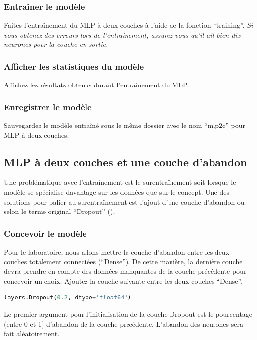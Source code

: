 \documentclass{article}
\begin{document}
\subsubsection{Entraîner le modèle}
Faites l'entraînement du MLP à deux couches à l'aide de la fonction ``training''.
\medbreak
\textit{Si vous obtenez des erreurs lors de l'entraînement, assurez-vous qu'il ait bien dix neurones pour la couche en sortie.}
\subsubsection{Afficher les statistiques du modèle}
Affichez les résultats obtenus durant l'entraînement du MLP.
\subsubsection{Enregistrer le modèle}
Sauvegardez le modèle entraîné sous le même dossier avec le nom ``mlp2c'' pour MLP à deux couches.

\subsection{MLP à deux couches et une couche d'abandon}
Une problématique avec l'entraînement est le surentraînement soit lorsque le modèle se spécialise davantage sur les données que sur le concept. Une des solutions pour palier au surentraînement est l'ajout d'une couche d'abandon ou selon le terme original ``Dropout'' (\cite{Dropout-article}).
\subsubsection{Concevoir le modèle}
Pour le laboratoire, nous allons mettre la couche d'abandon entre les deux couches totalement connectées (``Dense''). De cette manière, la dernière couche devra prendre en compte des données manquantes de la couche précédente pour concevoir un choix. Ajoutez la couche suivante entre les deux couches ``Dense''.
\medbreak

\begin{lstlisting}[language=Python, caption={Appel de la couche Dropout}, label={code:dropout_layer}]
layers.Dropout(0.2, dtype='float64')
\end{lstlisting}
\medbreak

Le premier argument pour l'initialisation de la couche Dropout est le pourcentage (entre 0 et 1) d'abandon de la couche précédente. L'abandon des neurones sera fait aléatoirement.
\end{document}
